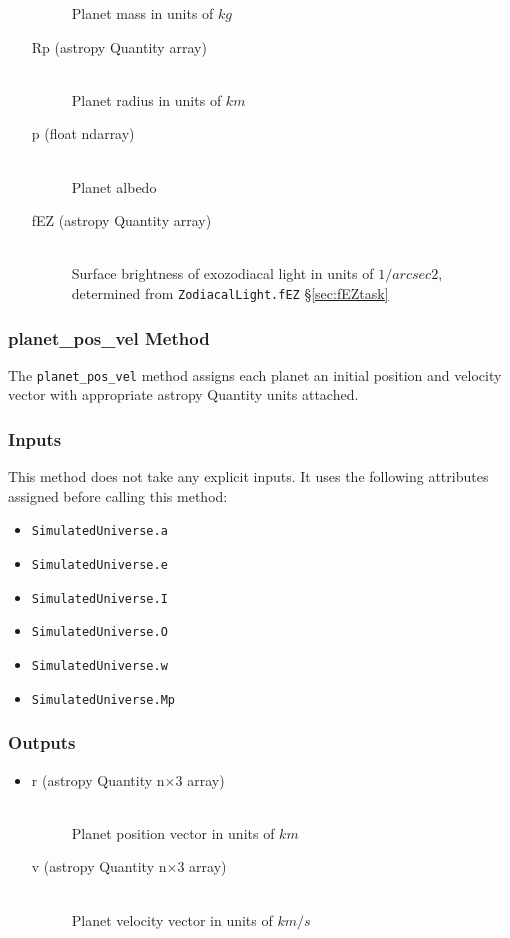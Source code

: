 \documentclass[cleanfoot]{asme2ej}
\begin{document}
\begin{itemize}
\begin{description}
            Planet mass in units of $ kg $
        \item[Rp (astropy Quantity array)] \hfill \\
            Planet radius in units of $ km $
        \item[p (float ndarray)] \hfill \\
            Planet albedo
        \item[fEZ (astropy Quantity array)] \hfill \\
            Surface brightness of exozodiacal light in units of $ 1/arcsec2 $, determined from \verb+ZodiacalLight.fEZ+ \S\ref{sec:fEZtask}
    \end{description}
\end{itemize}

\subsubsection{planet\_pos\_vel Method} \label{sec:planetposveltask}
The \verb+planet_pos_vel+ method assigns each planet an initial position and velocity vector with appropriate astropy Quantity units attached.

\subsubsection*{Inputs}
This method does not take any explicit inputs.  It uses the following attributes assigned before calling this method:
\begin{itemize}
    \item \verb+SimulatedUniverse.a+
    \item \verb+SimulatedUniverse.e+
    \item \verb+SimulatedUniverse.I+
    \item \verb+SimulatedUniverse.O+
    \item \verb+SimulatedUniverse.w+
    \item \verb+SimulatedUniverse.Mp+
\end{itemize}
\subsubsection*{Outputs}
\begin{itemize}
    \item 
    \begin{description}
        \item[r (astropy Quantity n$\times$3 array)] \hfill \\ Planet position vector in units of $ km $
        \item[v (astropy Quantity n$\times$3 array)] \hfill \\ Planet velocity vector in units of $ km/s $
    \end{description}
\end{itemize}
\end{document}
